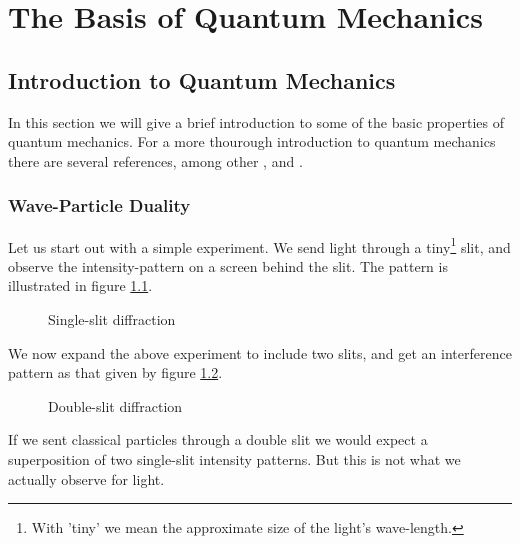 \chapter{The Basis of Quantum Mechanics}

%
\section{Introduction to Quantum Mechanics}

In this section we will give a brief introduction to some of the basic
properties of quantum mechanics. For a more thourough introduction to
quantum mechanics there are several references, among other
\cite{rohlf1994}, \cite{shankar1994} and \cite{hemmer1980}.

\subsection{Wave-Particle Duality}

Let us start out with a simple experiment. We send light through a
tiny\footnote{With 'tiny' we mean the approximate size of
the light's wave-length.} slit, and observe the
intensity-pattern on a screen behind the slit. The pattern is
illustrated in figure \ref{singleSlit}.

\begin{figure}[hbtp]
\begin{center}
  \caption{
    Single-slit diffraction
  }
  \label{singleSlit}
\end{center}
\end{figure}

We now expand the above experiment to include two slits, and get an
interference pattern as that given by figure \ref{doubleSlit}. 

\begin{figure}[hbtp]
\begin{center}
  \caption{
    Double-slit diffraction
  }
  \label{doubleSlit}
\end{center}
\end{figure}

If we sent classical particles through a double slit we would expect a
superposition of two single-slit intensity patterns. But this is not
what we actually observe for light.

